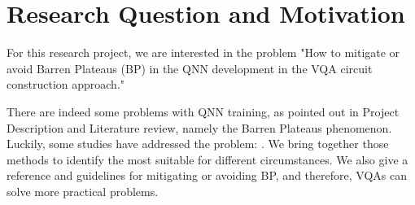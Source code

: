 \section{Research Question and Motivation}
For this research project, we are interested in the problem "How to mitigate or avoid Barren Plateaus (BP) in the QNN development in the VQA circuit construction approach."

There are indeed some problems with QNN training, as pointed out in Project Description and Literature review, namely the Barren Plateaus phenomenon.
Luckily, some studies have addressed the problem: \cite{pesahAbsenceBarrenPlateaus2021,pattiEntanglementDevisedBarren2021,liuParameterInitializationMethod2021}.
We bring together those methods to identify the most suitable for different circumstances.
We also give a reference and guidelines for mitigating or avoiding BP, and therefore, VQAs can solve more practical problems. 
